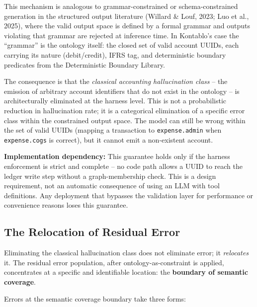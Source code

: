 This mechanism is analogous to grammar-constrained or schema-constrained
generation in the structured output literature (Willard \& Louf, 2023; Luo
et al., 2025), where the valid output space is defined by a formal grammar
and outputs violating that grammar are rejected at inference time. In
Kontablo's case the ``grammar'' is the ontology itself: the closed set of
valid account UUIDs, each carrying its nature (debit/credit), IFRS tag, and
deterministic boundary predicates from the Deterministic Boundary Library.

The consequence is that the \emph{classical accounting hallucination class} --
the emission of arbitrary account identifiers that do not exist in the
ontology -- is architecturally eliminated at the harness level.
This is not a probabilistic reduction in hallucination rate; it is a
categorical elimination of a specific error class within the constrained
output space. The model can still be wrong within the set of valid UUIDs
(mapping a transaction to \texttt{expense.admin} when \texttt{expense.cogs}
is correct), but it cannot emit a non-existent account.

\textbf{Implementation dependency:} This guarantee holds only if the harness
enforcement is strict and complete -- no code path allows a UUID to reach the
ledger write step without a graph-membership check. This is a design
requirement, not an automatic consequence of using an LLM with tool
definitions. Any deployment that bypasses the validation layer for performance
or convenience reasons loses this guarantee.

\subsection{The Relocation of Residual Error}
\label{subsec:residual_error}

Eliminating the classical hallucination class does not eliminate error; it
\emph{relocates} it. The residual error population, after ontology-as-constraint
is applied, concentrates at a specific and identifiable location: the
\textbf{boundary of semantic coverage}.



Errors at the semantic coverage boundary take three forms:

